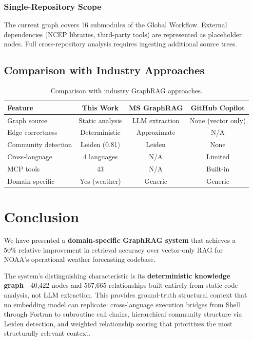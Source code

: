 \documentclass[11pt,letterpaper]{article}
\begin{document}
\subsubsection{Single-Repository Scope}

The current graph covers 16 submodules of the Global Workflow. External
dependencies (NCEP libraries, third-party tools) are represented as
placeholder nodes. Full cross-repository analysis requires ingesting
additional source trees.

\subsection{Comparison with Industry Approaches}

\begin{table}[H]
\centering
\caption{Comparison with industry GraphRAG approaches.}
\label{tab:industry}
\small
\begin{tabular}{@{}lccc@{}}
\toprule
\textbf{Feature} &
\textbf{This Work} &
\textbf{MS GraphRAG} &
\textbf{GitHub Copilot} \\
\midrule
Graph source        & Static analysis & LLM extraction & None (vector only) \\
Edge correctness    & Deterministic   & Approximate    & N/A \\
Community detection & Leiden (0.81)   & Leiden         & None \\
Cross-language      & 4 languages     & N/A            & Limited \\
MCP tools           & 43              & N/A            & Built-in \\
Domain-specific     & Yes (weather)   & Generic        & Generic \\
\bottomrule
\end{tabular}
\end{table}

\section{Conclusion}
\label{sec:conclusion}

We have presented a \textbf{domain-specific GraphRAG system} that
achieves a 50\% relative improvement in retrieval accuracy over
vector-only RAG for NOAA's operational weather forecasting codebase.

The system's distinguishing characteristic is its
\textbf{deterministic knowledge graph}---40,422 nodes and 567,665
relationships built entirely from static code analysis, not LLM
extraction. This provides ground-truth structural context that no
embedding model can replicate: cross-language execution bridges from
Shell through Fortran to subroutine call chains, hierarchical
community structure via Leiden detection, and weighted relationship
scoring that prioritizes the most structurally relevant context.
\end{document}

